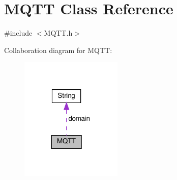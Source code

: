 \hypertarget{class_m_q_t_t}{}\section{M\+Q\+TT Class Reference}
\label{class_m_q_t_t}


{\ttfamily \#include $<$M\+Q\+T\+T.\+h$>$}



Collaboration diagram for M\+Q\+TT\+:\nopagebreak
\begin{figure}[H]
\begin{center}
\leavevmode
\includegraphics[width=137pt]{class_m_q_t_t__coll__graph}
\end{center}
\end{figure}
